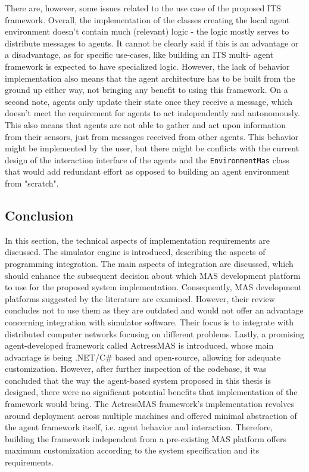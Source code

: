 \documentclass[0main.tex]{subfiles}
\begin{document}
There are, however, some issues related to the use case of the proposed ITS framework. Overall, the implementation of the classes 
creating the local agent environment doesn't contain much (relevant) logic - the logic mostly serves to distribute messages to agents. 
It cannot be clearly said if this is an advantage or a disadvantage, as for specific use-cases, like building an ITS multi-
agent framework is expected to have specialized logic. However, the lack of behavior implementation also means that the 
agent architecture has to be built from the ground up either way, not bringing any benefit to using this framework. 
On a second note, agents only update their state once they receive a message, which doesn't 
meet the requirement for agents to act independently and autonomously. This also means that agents are not able to gather 
and act upon information from their sensors, just from messages received from other agents. This behavior might be implemented 
by the user, but there might be conflicts with the current design of the interaction interface of the agents and the 
\texttt{EnvironmentMas} class that would add redundant effort as opposed to building an agent environment from "scratch". 

\subsection{Conclusion}

In this section, the technical aspects of implementation requirements are discussed. The
simulator engine is introduced, describing the aspects of programming integration. The main
aspects of integration are discussed, which should enhance the subsequent decision about
which MAS development platform to use for the proposed system implementation. Consequently, MAS
development platforms suggested by the literature are examined. However, their review concludes
not to use them as they are outdated and would not offer an advantage concerning integration
with simulator software. Their focus is to integrate with distributed computer networks
focusing on different problems. Lastly, a promising agent-developed framework called 
ActressMAS is introduced, whose main advantage is being .NET/C\# based
and open-source, allowing for adequate customization. However, after further inspection of the
codebase, it was concluded that the way the agent-based system proposed in this thesis is
designed, there were no significant potential benefits that implementation of the framework 
would bring. The ActressMAS framework's implementation revolves around deployment across 
multiple machines and offered minimal abstraction of the agent framework itself, i.e. 
agent behavior and interaction. Therefore, building the framework independent from a
pre-existing MAS platform offers maximum customization according to the system
specification and its requirements. 

\clearpage
\end{document}
